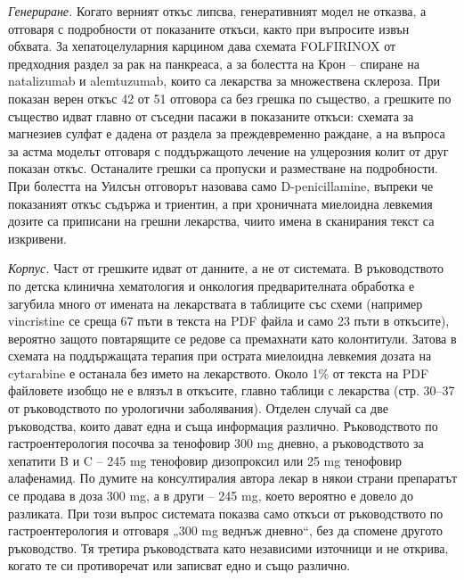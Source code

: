 \documentclass[12pt,a4paper]{article}
\begin{document}
\emph{Генериране.} Когато верният откъс липсва, генеративният модел не отказва, а отговаря с подробности от показаните откъси, както при въпросите извън обхвата. За хепатоцелуларния карцином дава схемата FOLFIRINOX от предходния раздел за рак на панкреаса, а за болестта на Крон -- спиране на natalizumab и alemtuzumab, които са лекарства за множествена склероза. При показан верен откъс 42 от 51 отговора са без грешка по същество, а грешките по същество идват главно от съседни пасажи в показаните откъси: схемата за магнезиев сулфат е дадена от раздела за преждевременно раждане, а на въпроса за астма моделът отговаря с поддържащото лечение на улцерозния колит от друг показан откъс. Останалите грешки са пропуски и разместване на подробности. При болестта на Уилсън отговорът назовава само D-penicillamine, въпреки че показаният откъс съдържа и триентин, а при хроничната миелоидна левкемия дозите са приписани на грешни лекарства, чиито имена в сканирания текст са изкривени.

\emph{Корпус.} Част от грешките идват от данните, а не от системата. В ръководството по детска клинична хематология и онкология предварителната обработка е загубила много от имената на лекарствата в таблиците със схеми (например vincristine се среща 67 пъти в текста на PDF файла и само 23 пъти в откъсите), вероятно защото повтарящите се редове са премахнати като колонтитули. Затова в схемата на поддържащата терапия при острата миелоидна левкемия дозата на cytarabine е останала без името на лекарството. Около 1\% от текста на PDF файловете изобщо не е влязъл в откъсите, главно таблици с лекарства (стр. 30--37 от ръководството по урологични заболявания). Отделен случай са две ръководства, които дават една и съща информация различно. Ръководството по гастроентерология посочва за тенофовир 300 mg дневно, а ръководството за хепатити B и C -- 245 mg тенофовир дизопроксил или 25 mg тенофовир алафенамид. По думите на консултиралия автора лекар в някои страни препаратът се продава в доза 300 mg, а в други -- 245 mg, което вероятно е довело до разликата. При този въпрос системата показва само откъси от ръководството по гастроентерология и отговаря „300 mg веднъж дневно“, без да спомене другото ръководство. Тя третира ръководствата като независими източници и не открива, когато те си противоречат или записват едно и също различно.
\end{document}
